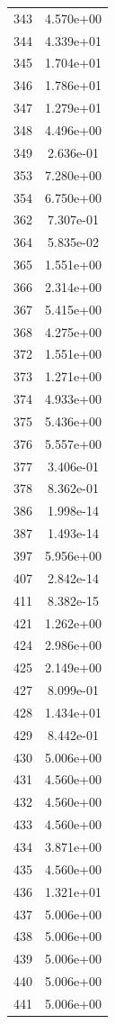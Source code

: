 \documentclass[12pt]{article}
\begin{document}
\begin{longtable}{@{}cc@{}}
343 & 4.570e+00 \\
344 & 4.339e+01 \\
345 & 1.704e+01 \\
346 & 1.786e+01 \\
347 & 1.279e+01 \\
348 & 4.496e+00 \\
349 & 2.636e-01 \\
353 & 7.280e+00 \\
354 & 6.750e+00 \\
362 & 7.307e-01 \\
364 & 5.835e-02 \\
365 & 1.551e+00 \\
366 & 2.314e+00 \\
367 & 5.415e+00 \\
368 & 4.275e+00 \\
372 & 1.551e+00 \\
373 & 1.271e+00 \\
374 & 4.933e+00 \\
375 & 5.436e+00 \\
376 & 5.557e+00 \\
377 & 3.406e-01 \\
378 & 8.362e-01 \\
386 & 1.998e-14 \\
387 & 1.493e-14 \\
397 & 5.956e+00 \\
407 & 2.842e-14 \\
411 & 8.382e-15 \\
421 & 1.262e+00 \\
424 & 2.986e+00 \\
425 & 2.149e+00 \\
427 & 8.099e-01 \\
428 & 1.434e+01 \\
429 & 8.442e-01 \\
430 & 5.006e+00 \\
431 & 4.560e+00 \\
432 & 4.560e+00 \\
433 & 4.560e+00 \\
434 & 3.871e+00 \\
435 & 4.560e+00 \\
436 & 1.321e+01 \\
437 & 5.006e+00 \\
438 & 5.006e+00 \\
439 & 5.006e+00 \\
440 & 5.006e+00 \\
441 & 5.006e+00 \\

\end{longtable}
\end{document}
